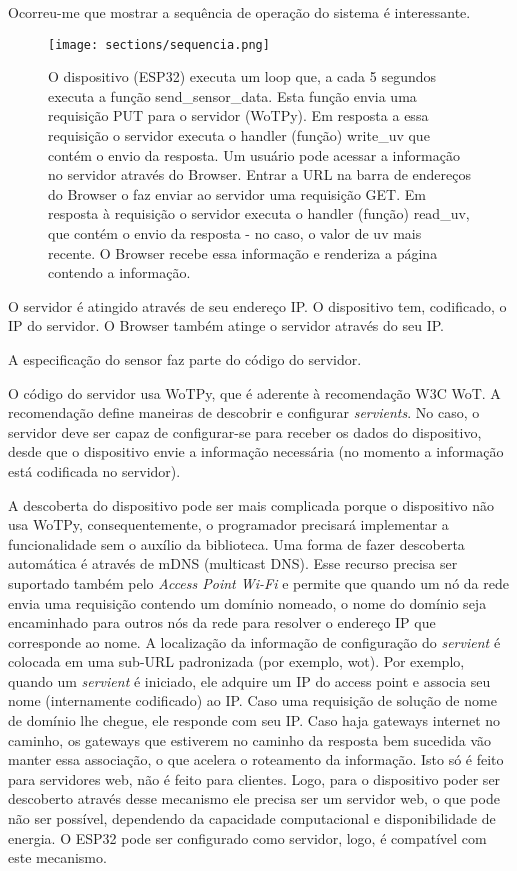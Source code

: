 Ocorreu-me que mostrar a sequência de operação do sistema é interessante.

\begin{figure}
    \centering
    \texttt{[image: sections/sequencia.png]}
    \caption{O dispositivo (ESP32) executa um loop que, a cada 5 segundos executa a função send\_sensor\_data. Esta função envia uma requisição PUT para o servidor (WoTPy). Em resposta a essa requisição o servidor executa o handler (função) write\_uv que contém o envio da resposta. Um usuário pode acessar a informação no servidor através do Browser. Entrar a URL na barra de endereços do Browser o faz enviar ao servidor uma requisição GET. Em resposta à requisição o servidor executa o handler (função) read\_uv, que contém o envio da resposta - no caso, o valor de uv mais recente. O Browser recebe essa informação e renderiza a página contendo a informação.}
    \label{fig:sequencia}
\end{figure}

O servidor é atingido através de seu endereço IP. O dispositivo tem, codificado, o IP do servidor. O Browser também atinge o servidor através do seu IP. 

A especificação do sensor faz parte do código do servidor.

O código do servidor usa WoTPy, que é aderente à recomendação W3C WoT. A recomendação define maneiras de descobrir e configurar \textit{servients}. No caso, o servidor deve ser capaz de configurar-se para receber os dados do dispositivo, desde que o dispositivo envie a informação necessária (no momento a informação está codificada no servidor).

A descoberta do dispositivo pode ser mais complicada porque o dispositivo não usa WoTPy, consequentemente, o programador precisará implementar a funcionalidade sem o auxílio da biblioteca. Uma forma de fazer descoberta automática é através de mDNS (multicast DNS). Esse recurso precisa ser suportado também pelo \textit{Access Point Wi-Fi} e permite que quando um nó da rede envia uma requisição contendo um domínio nomeado, o nome do domínio seja encaminhado para outros nós da rede para resolver o endereço IP que corresponde ao nome. A localização da informação de configuração do \textit{servient} é colocada em uma sub-URL padronizada (por exemplo, wot). Por exemplo, quando um \textit{servient} é iniciado, ele adquire um IP do access point e associa seu nome (internamente codificado) ao IP. Caso uma requisição de solução de nome de domínio lhe chegue, ele responde com seu IP. Caso haja gateways internet no caminho, os gateways que estiverem no caminho da resposta bem sucedida vão manter essa associação, o que acelera o roteamento da informação. Isto só é feito para servidores web, não é feito para clientes. Logo, para o dispositivo poder ser descoberto através desse mecanismo ele precisa ser um servidor web, o que pode não ser possível, dependendo da capacidade computacional e disponibilidade de energia. O ESP32 pode ser configurado como servidor, logo, é compatível com este mecanismo.

